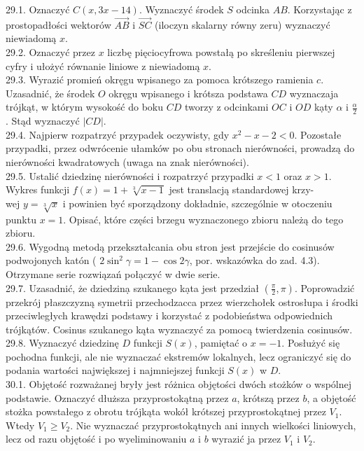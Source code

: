 \documentclass[10pt]{article}
\begin{document}
29.1. Oznaczyć $C(x, 3 x-14)$. Wyznaczyć środek $S$ odcinka $A B$. Korzystając z prostopadłości wektorów $\overrightarrow{A B}$ i $\overrightarrow{S C}$ (iloczyn skalarny równy zeru) wyznaczyć niewiadomą $x$.\\
29.2. Oznaczyć przez $x$ liczbę pięciocyfrowa powstałą po skreśleniu pierwszej cyfry i ułożyć równanie liniowe z niewiadomą $x$.\\
29.3. Wyrazić promień okręgu wpisanego za pomoca krótszego ramienia $c$. Uzasadnić, że środek $O$ okręgu wpisanego i krótsza podstawa $C D$ wyznaczaja trójkąt, w którym wysokość do boku $C D$ tworzy z odcinkami $O C$ i $O D$ kạty $\alpha$ i $\frac{\alpha}{2}$. Stąd wyznaczyć $|C D|$.\\
29.4. Najpierw rozpatrzyć przypadek oczywisty, gdy $x^{2}-x-2<0$. Pozostałe przypadki, przez odwrócenie ułamków po obu stronach nierówności, prowadzą do nierówności kwadratowych (uwaga na znak nierówności).\\
29.5. Ustalić dziedzinę nierówności i rozpatrzyć przypadki $x<1$ oraz $x>1$. Wykres funkcji $f(x)=1+\sqrt[3]{x-1}$ jest translacją standardowej krzy-\\
wej $y=\sqrt[3]{x}$ i powinien być sporządzony dokładnie, szczególnie w otoczeniu punktu $x=1$. Opisać, które części brzegu wyznaczonego zbioru należą do tego zbioru.\\
29.6. Wygodną metodą przekształcania obu stron jest przejście do cosinusów podwojonych katón ( $2 \sin ^{2} \gamma=1-\cos 2 \gamma$, por. wskazówka do zad. 4.3). Otrzymane serie rozwiązań połạczyć w dwie serie.\\
29.7. Uzasadnić, że dziedzinạ szukanego kạta jest przedział $\left(\frac{\pi}{2}, \pi\right)$. Poprowadzić przekrój płaszczyzną symetrii przechodzacca przez wierzchołek ostrosłupa i środki przeciwległych krawędzi podstawy i korzystać z podobieństwa odpowiednich trójkątów. Cosinus szukanego kąta wyznaczyć za pomocą twierdzenia cosinusów.\\
29.8. Wyznaczyć dziedzinę $D$ funkcji $S(x)$, pamiętać o $x=-1$. Posłużyć się pochodna funkcji, ale nie wyznaczać ekstremów lokalnych, lecz ograniczyć się do podania wartości największej i najmniejszej funkcji $S(x)$ w $D$.\\
30.1. Objętość rozważanej bryły jest różnica objętości dwóch stożków o wspólnej podstawie. Oznaczyć dłuższa przyprostokątną przez $a$, krótszą przez $b$, a objętość stożka powstałego z obrotu trójkąta wokół krótszej przyprostokątnej przez $V_{1}$. Wtedy $V_{1} \geq V_{2}$. Nie wyznaczać przyprostokątnych ani innych wielkości liniowych, lecz od razu objętość i po wyeliminowaniu $a$ i $b$ wyrazić ja przez $V_{1}$ i $V_{2}$.\\
\end{document}
